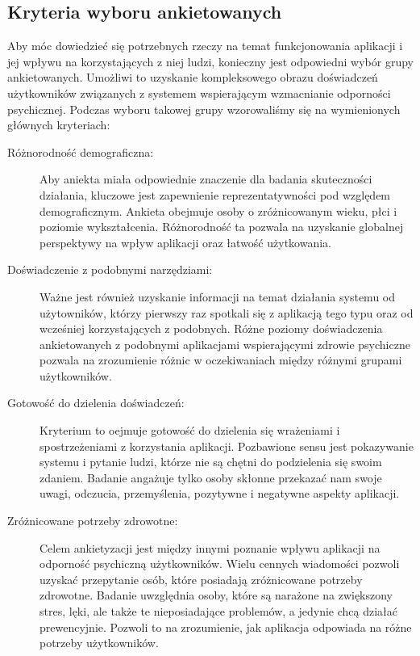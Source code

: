 \subsection{Kryteria wyboru ankietowanych}
Aby móc dowiedzieć się potrzebnych rzeczy na temat funkcjonowania aplikacji i jej wpływu na korzystających z niej ludzi, konieczny jest odpowiedni wybór grupy ankietowanych. Umożliwi to uzyskanie kompleksowego obrazu doświadczeń użytkowników związanych z systemem wspierającym wzmacnianie odporności psychicznej. Podczas wyboru takowej grupy wzorowaliśmy się na wymienionych głównych kryteriach:
\begin{description}
    \item[Różnorodność demograficzna:] 
    Aby aniekta miała odpowiednie znaczenie dla badania skuteczności działania, kluczowe jest zapewnienie reprezentatywności pod względem demograficznym. Ankieta obejmuje osoby o zróżnicowanym wieku, płci i poziomie wykształcenia. Różnorodność ta pozwala na uzyskanie globalnej perspektywy na wpływ aplikacji oraz łatwość użytkowania.
    \item[Doświadczenie z podobnymi narzędziami:] Ważne jest również uzyskanie informacji na temat działania systemu od użytowników, którzy pierwszy raz spotkali się z aplikacją tego typu oraz od wcześniej korzystających z podobnych. Różne poziomy doświadczenia ankietowanych z podobnymi aplikacjami wspierającymi zdrowie psychiczne pozwala na zrozumienie różnic w oczekiwaniach między różnymi grupami użytkowników.
    \item[Gotowość do dzielenia doświadczeń:] Kryterium to oejmuje gotowość do dzielenia się wrażeniami i spostrzeżeniami z korzystania aplikacji. Pozbawione sensu jest pokazywanie systemu i pytanie ludzi, którze nie są chętni do podzielenia się swoim zdaniem. Badanie angażuje tylko osoby skłonne przekazać nam swoje uwagi, odczucia, przemyślenia, pozytywne i negatywne aspekty aplikacji.
    \item[Zróżnicowane potrzeby zdrowotne:] Celem ankietyzacji jest między innymi poznanie wpływu aplikacji na odporność psychiczną użytkowników. Wielu cennych wiadomości pozwoli uzyskać przepytanie osób, które posiadają zróżnicowane potrzeby zdrowotne. Badanie uwzględnia osoby, które są narażone na zwiększony stres, lęki, ale także te nieposiadające problemów, a jedynie chcą działać prewencyjnie. Pozwoli to na zrozumienie, jak aplikacja odpowiada na różne potrzeby użytkowników. 
\end{description}

